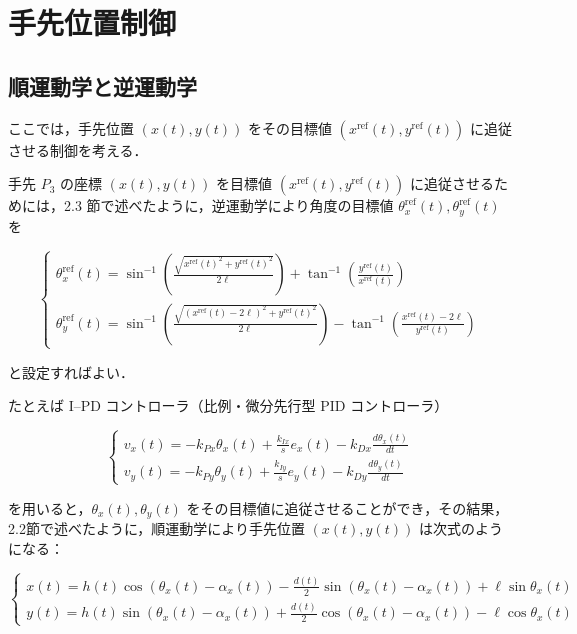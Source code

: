 \section{手先位置制御}
\subsection{順運動学と逆運動学}

ここでは，手先位置 $(x(t), y(t))$ をその目標値 $(x^{\mathrm{ref}}(t), y^{\mathrm{ref}}(t))$ に追従させる制御を考える．

手先 $P_3$ の座標 $(x(t), y(t))$ を目標値 $(x^{\mathrm{ref}}(t), y^{\mathrm{ref}}(t))$ に追従させるためには，2.3 節で述べたように，逆運動学により角度の目標値 $\theta_x^{\mathrm{ref}}(t), \theta_y^{\mathrm{ref}}(t)$ を

\begin{equation}
\begin{cases}
\theta_x^{\mathrm{ref}}(t) = \sin^{-1} \left( \frac{\sqrt{x^{\mathrm{ref}}(t)^2 + y^{\mathrm{ref}}(t)^2}}{2\ell} \right) + \tan^{-1} \left( \frac{y^{\mathrm{ref}}(t)}{x^{\mathrm{ref}}(t)} \right) \\
\theta_y^{\mathrm{ref}}(t) = \sin^{-1} \left( \frac{\sqrt{(x^{\mathrm{ref}}(t)-2\ell)^2 + y^{\mathrm{ref}}(t)^2}}{2\ell} \right) - \tan^{-1} \left( \frac{x^{\mathrm{ref}}(t) - 2\ell}{y^{\mathrm{ref}}(t)} \right)
\end{cases}
\end{equation}

と設定すればよい．

\vspace{1em}
たとえば I--PD コントローラ（比例・微分先行型 PID コントローラ）

\begin{equation}
\begin{cases}
v_x(t) = -k_{Px} \theta_x(t) + \frac{k_{Ix}}{s} e_x(t) - k_{Dx} \frac{d\theta_x(t)}{dt} \\
v_y(t) = -k_{Py} \theta_y(t) + \frac{k_{Iy}}{s} e_y(t) - k_{Dy} \frac{d\theta_y(t)}{dt}
\end{cases}
\end{equation}

を用いると，$\theta_x(t), \theta_y(t)$ をその目標値に追従させることができ，その結果，2.2節で述べたように，順運動学により手先位置 $(x(t), y(t))$ は次式のようになる：

\begin{equation}
\begin{cases}
x(t) = h(t) \cos(\theta_x(t) - \alpha_x(t)) - \frac{d(t)}{2} \sin(\theta_x(t) - \alpha_x(t)) + \ell \sin \theta_x(t) \\
y(t) = h(t) \sin(\theta_x(t) - \alpha_x(t)) + \frac{d(t)}{2} \cos(\theta_x(t) - \alpha_x(t)) - \ell \cos \theta_x(t)
\end{cases}
\end{equation}

